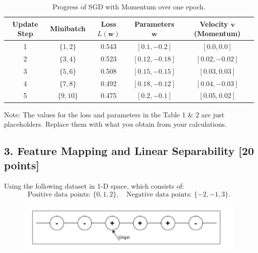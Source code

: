 \documentclass[a3paper,12pt]{article} %
\begin{document}
\begin{table}[h!]
\centering
\begin{tabular}{|c|c|c|c|c|}
\hline
\textbf{Update Step} & \textbf{Minibatch} & \textbf{Loss $L(\mathbf{w})$} & \textbf{Parameters $\mathbf{w}$} & \textbf{Velocity $\mathbf{v}$ (Momentum)} \\ \hline
1 & $\{1, 2\}$ & 0.543 & $[0.1, -0.2]$ & $[0.0, 0.0]$ \\ \hline
2 & $\{3, 4\}$ & 0.523 & $[0.12, -0.18]$ & $[0.02, -0.02]$ \\ \hline
3 & $\{5, 6\}$ & 0.508 & $[0.15, -0.15]$ & $[0.03, 0.03]$ \\ \hline
4 & $\{7, 8\}$ & 0.492 & $[0.18, -0.12]$ & $[0.04, -0.03]$ \\ \hline
5 & $\{9, 10\}$ & 0.475 & $[0.2, -0.1]$ & $[0.05, 0.02]$ \\ \hline
\end{tabular}
\caption{Progress of SGD with Momentum over one epoch.}
\label{tab:table2}
\end{table}

Note: The values for the loss and parameters in the Table 1 \& 2 are just placeholders. Replace them with what you obtain from your calculations.


\vspace{30pt}
\subsection*{3. Feature Mapping and Linear Separability [20 points]}

Using the following dataset in 1-D space, which consists of:
\[
\text{Positive data points: } \{0, 1, 2\}, \quad \text{Negative data points: } \{-2, -1, 3\}.
\]

\begin{figure}[h!]
    \centering
    \includegraphics[width=0.5\linewidth]{drawio.png}
    \label{fig:enter-label}
\end{figure}
\end{document}
